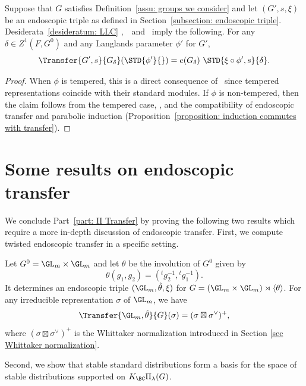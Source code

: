 \documentclass[11pt,letterpaper]{amsart}
\numberwithin{equation}{section}
\begin{document}
\begin{theorem}\label{theorem: transfer of STD}
Suppose that $G$ satisfies Definition~\ref{assu: groups we consider} and let $(G',s,\xi)$ be an endoscopic triple as defined in Section~\ref{subsection: endoscopic triple}.
Desiderata~\ref{desideratum: LLC} \ECR,\  \LC\ and \Sta\  imply the following.
    For any $\delta \in Z^1(F,G^0)$ and any Langlands parameter $\phi'$ for $G'$,
    \begin{equation*}
        \Transfer{G',s}{G_\delta}(\STD{\phi'}{}) = e(G_\delta)\ 
        \STD{\xi\circ\phi',{{s}}}{\delta}.
    \end{equation*}
\end{theorem}

\begin{proof}
When $\phi$ is tempered, this is a direct consequence of \ECR \ since tempered representations coincide with their standard modules. If $\phi$ is non-tempered, then the claim follows from the tempered case, \LC, and the compatibility of endoscopic transfer and parabolic induction (Proposition~\ref{proposition: induction commutes with transfer}).
\end{proof}



\section{Some results on endoscopic transfer}\label{section: Bin} 

We conclude Part~\ref{part: II Transfer} by proving the following two results which require a more in-depth discussion of endoscopic transfer.
First, we compute twisted endoscopic transfer in a specific setting.

\begin{proposition}\label{prop twisted transfer from Siegel GL to disconencted GL}
Let $G^0 =\GL_m \times  \GL_m$ and let $\theta$ be the involution of $G^0$ given by
\[ \theta(g_1, g_2) = ({}^t g_2^{-1}, {}^t g_1^{-1}).\]
It determines an endoscopic triple $(\GL_m, \hat{\theta}, \xi)$ for $G = (\GL_m\times\GL_m)\rtimes\langle\theta\rangle$.
For any irreducible representation $\sigma$ of $\GL_m$, we have 
\[ \Transfer{\GL_m, \hat{\theta}}{G} (\sigma) = (\sigma \boxtimes \sigma^{\vee})^+,\]
    where $(\sigma \boxtimes \sigma^{\vee})^+$ is the Whittaker normalization introduced in Section \ref{sec Whittaker normalization}.
\end{proposition}

Second, we show that stable standard distributions form a basis for the space of stable distributions supported on  $K_{\BC}\Pi_{\lambda}(G)$.
\end{document}

